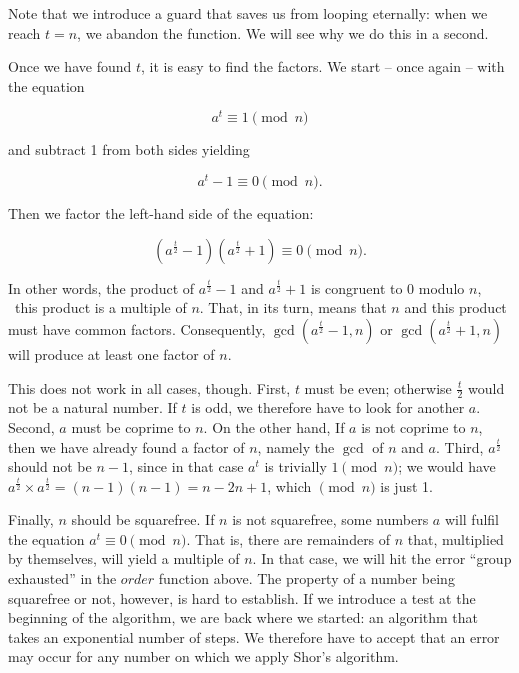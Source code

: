\documentclass{scrreprt}
\newcommand{\Varid}[1]{\mathit{#1}}
\begin{document}
Note that we introduce a guard 
that saves us from looping eternally:
when we reach $t = n$, we abandon
the function.
We will see why we do this in a second.

Once we have found $t$,
it is easy to find the factors.
We start -- once again -- with the equation

\begin{equation}
a^t \equiv 1 \pmod{n}
\end{equation}

and subtract 1 from both sides yielding

\begin{equation}
a^t - 1 \equiv 0 \pmod{n}.
\end{equation}

Then we factor the left-hand side of the equation:

\begin{equation}
(a^{\frac{t}{2}} - 1)(a^{\frac{t}{2}} + 1) \equiv 0 \pmod{n}.
\end{equation}

In other words,
the product of $a^{\frac{t}{2}} - 1$ and $a^{\frac{t}{2}} + 1$
is congruent to 0 modulo $n$, \ie\
this product is a multiple of $n$.
That, in its turn, means that $n$ and this product
must have common factors. Consequently,
$\gcd(a^{\frac{t}{2}} - 1, n)$ or 
$\gcd(a^{\frac{t}{2}} + 1, n)$
will produce at least one factor of $n$.

This does not work in all cases, though.
First, $t$ must be even;
otherwise $\frac{t}{2}$ would not be a natural number.
If $t$ is odd, we therefore have to look for another $a$.
Second, $a$ must be coprime to $n$.
On the other hand, If $a$ is not coprime to $n$,
then we have already found a factor of $n$,
namely the $\gcd$ of $n$ and $a$.
Third, $a^{\frac{t}{2}}$ should not be
$n-1$, since in that case
$a^t$ is trivially $1 \pmod{n}$;
we would have 
$a^{\frac{t}{2}}\times a^{\frac{t}{2}} =
(n-1)(n-1) = n - 2n + 1$, which $\pmod n$
is just 1.

Finally, $n$ should be squarefree.
If $n$ is not squarefree,
some numbers $a$ will fulfil the equation
$a^t \equiv 0 \pmod{n}$.
That is, there are remainders of $n$
that, multiplied by themselves,
will yield a multiple of $n$.
In that case, we will hit the error
``group exhausted'' in the \ensuremath{\Varid{order}} function above.
The property of a number 
being squarefree or not, however,
is hard to establish.
If we introduce a test 
at the beginning of the algorithm,
we are back where we started:
an algorithm that takes 
an exponential number of steps.
We therefore have to accept
that an error may occur for any number
on which we apply Shor's algorithm.
\end{document}
